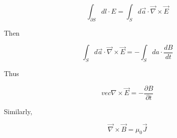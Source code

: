 \documentclass{article}
\newtheorem{one minute paper}[theorem]{One Minute Paper}
\begin{document}
\begin{equation}
    \int_{\partial S}dl \cdot E = \int_{S} d\vec{a} \cdot \vec{\nabla} \times \vec{E}
\end{equation}

Then 

\begin{equation}
    \int_{S} d\vec{a} \cdot \vec{\nabla} \times \vec{E} = -\int_S da \cdot \frac{dB}{dt}
\end{equation}

Thus 

\begin{equation}
    vec{\nabla} \times \vec{E} = -\frac{\partial B}{\partial t}
\end{equation}

Similarly,

\begin{equation}
    \vec{\nabla} \times \vec{B} = \mu_0 \vec{J}
\end{equation}
\end{document}
